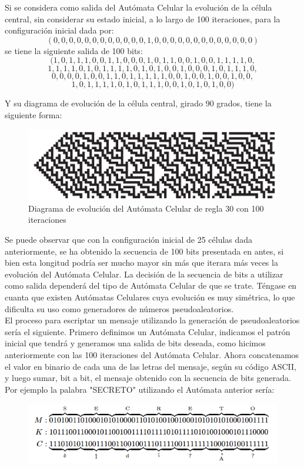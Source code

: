 Si se considera como salida del Autómata Celular la evolución de la célula central, sin considerar su estado inicial, a lo largo de 100 iteraciones, para la configuración inicial dada por:
$$(0,0,0,0,0,0,0,0,0,0,0,0,1,0,0,0,0,0,0,0,0,0,0,0,0,0)$$
se tiene la siguiente salida de 100 bits:
$$(1,0,1,1,1,0,0,1,1,0,0,0,1,0,1,1,0,0,1,0,0,1,1,1,1,0,$$
$$1,1,1,1,0,1,0,1,1,1,1,0,1,0,1,0,0,1,0,0,0,1,0,1,1,1,0,$$
$$0,0,0,0,1,0,0,1,1,0,1,1,1,1,1,0,0,1,0,0,1,0,0,1,0,0,$$
$$1,0,1,1,1,1,0,1,0,1,1,1,0,0,1,0,1,0,1,0,0)$$

Y su diagrama de evolución de la célula central, girado 90 grados, tiene la siguiente forma:

\begin{figure}[H]
\centering
\includegraphics[scale=0.7]{imagenes/regla_30_100.png}
\caption{Diagrama de evolución del Autómata Celular de regla 30 con 100 iteraciones}
\end{figure}

Se puede observar que con la configuración inicial de 25 células dada anteriormente, se ha obtenido la secuencia de 100 bits presentada en antes, si bien esta longitud podría ser mucho mayor sin más que iterara más veces la evolución del Autómata Celular. La decisión de la secuencia de bits a utilizar como salida dependerá del tipo de Autómata Celular de que se trate. Téngase en cuanta que existen Autómatas Celulares cuya evolución es muy simétrica, lo que dificulta su uso como generadores de números pseudoaleatorios.\\

El proceso para escriptar un mensaje utilizando la generación de pseudoaleatorios sería el siguiente. Primero definimos un Autómata Celular, indicamos el patrón inicial que tendrá y generamos una salida de bits deseada, como hicimos anteriormente con las 100 iteraciones del Autómata Celular. Ahora concatenamos el valor en binario de cada una de las letras del mensaje, según su código ASCII, y luego sumar, bit a bit, el mensaje obtenido con la secuencia de bits generada. Por ejemplo la palabra "SECRETO" utilizando el Autómata anterior sería:

\begin{figure}[H]
\centering
\includegraphics[scale=0.7]{imagenes/secreto.png}
\end{figure}


